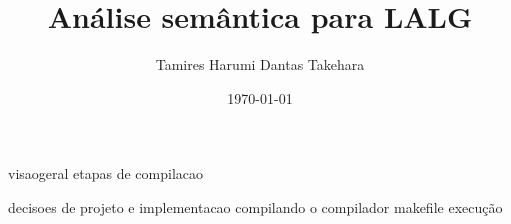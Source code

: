 \documentclass[a4paper]{article}
\title{Análise semântica para LALG}
\author{Tamires Harumi Dantas Takehara}
\date{\today}
\begin{document}
	\maketitle
	
	visaogeral
		etapas de compilacao
	
	decisoes de projeto e implementacao
	compilando o compilador
		makefile
		execução
\end{document}
